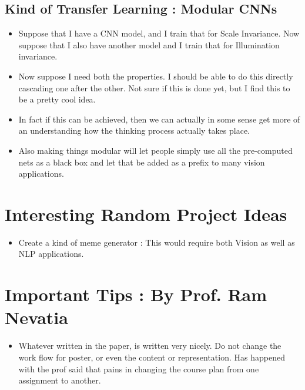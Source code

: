 \documentclass{article}
\begin{document}
\subsection{Kind of Transfer Learning : Modular CNNs}
\begin{itemize}
\item Suppose that I have a CNN model, and I train that for Scale Invariance. Now suppose that I also have another model and I train that for Illumination invariance.
\item Now suppose I need both the properties. I should be able to do this directly cascading one after the other. Not sure if this is done yet, but I find this to be a pretty cool idea.
\item In fact if this can be achieved, then we can actually in some sense get more of an understanding how the thinking process actually takes place.
\item Also making things modular will let people simply use all the pre-computed nets as a black box and let that be added as a prefix to many vision applications.
\end{itemize}

\section{Interesting Random Project Ideas}
\begin{itemize}
\item Create a kind of meme generator : This would require both Vision as well as NLP applications.
\end{itemize}

\section{Important Tips : By Prof. Ram Nevatia}
\begin{itemize}
\item Whatever written in the paper, is written very nicely. Do not change the work flow for poster, or even the content or representation. Has happened with the prof said that pains in changing the course plan from one assignment to another.
\end{itemize}
\end{document}
